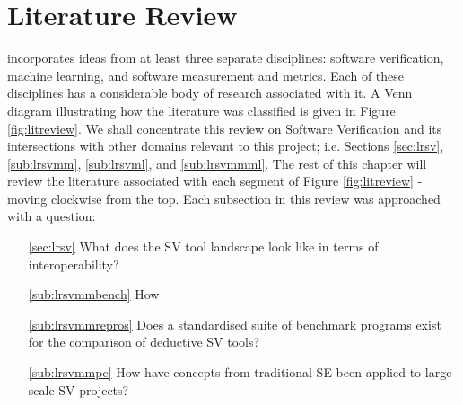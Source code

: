 \chapter{Literature Review}%
\thispagestyle{nohead}
\label{LitReview} %


\where incorporates ideas from at least three separate disciplines: software verification, machine learning, and software measurement and metrics. Each of these disciplines has a considerable body of research associated with it.
A Venn diagram illustrating how the literature was classified is given in Figure \ref{fig:litreview}. 
We shall concentrate this review on Software Verification and its intersections with other domains relevant to this project; i.e. Sections \ref{sec:lrsv}, \ref{sub:lrsvmm}, \ref{sub:lrsvml}, and \ref{sub:lrsvmmml}. 
The rest of this chapter will review the literature associated with each segment of Figure \ref{fig:litreview} - moving clockwise from the top. 
Each subsection in this review was approached with a question:
\begin{itemize}
	\item[\ref{sec:lrsv}] What does the SV tool landscape look like in terms of interoperability?
	\item[\ref{sub:lrsvmmbench}] How 
	\item[\ref{sub:lrsvmmrepros}] Does a standardised suite of benchmark programs exist for the comparison of deductive SV tools?
	\item[\ref{sub:lrsvmmpe}] How have concepts from traditional SE been applied to large-scale SV projects? 
	
\end{itemize}


